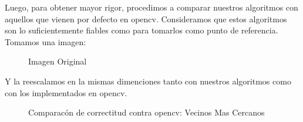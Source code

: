 Luego, para obtener mayor rigor, procedimos a comparar nuestros algoritmos con aquellos que vienen por defecto en opencv. Consideramos que estos algoritmos son lo suficientemente fiables como para tomarlos como punto de referencia. Tomamos una imagen:
\begin{figure}[H]
    \centering
{}
\caption{Imagen Original}
\end{figure}
Y la reescalamos en la mismas dimenciones tanto con nuestros algoritmos como con los implementados en opencv.

\begin{figure}[H]
    \centering
    \qquad
    \caption{Comparacón de correctitud contra opencv: Vecinos Mas Cercanos}
\end{figure}

